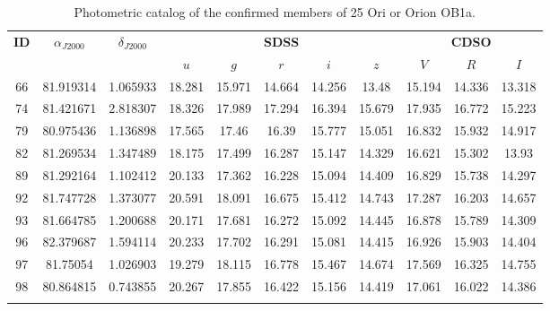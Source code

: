 \documentclass[12pt]{article}
\begin{document}
\begin{table} \scriptsize
 \caption[Photometric catalog of the confirmed members from the BOSS spectra]{Photometric catalog of the confirmed members of 25 Ori or Orion OB1a.}
 \label{tab_BOSS:photometry}
 \begin{threeparttable}
  \setlength{\tabcolsep}{12pt}
  \begin{tabular}{@{\extracolsep{2pt}}ccccccccccc@{}}
	\toprule
	{\bf ID} & {\bf $\alpha_{J2000}$} & $\delta_{J2000}$ & \multicolumn{5}{c}{{\bf SDSS}} & \multicolumn{3}{c}{{\bf CDSO}} \\
   	\cline{4-8}
   	\cline{9-11}
	& & & $u$ & $g$ & $r$ & $i$ & $z$ & $V$    & $R$    & $I$ \\
	\midrule
 	66  & 81.919314 & 1.065933 & 18.281    & 15.971    & 14.664    & 14.256    & 13.48     & 15.194 & 14.336 & 13.318 \\
  	74  & 81.421671 & 2.818307 & 18.326    & 17.989    & 17.294    & 16.394    & 15.679    & 17.935 & 16.772 & 15.223 \\
  	79  & 80.975436 & 1.136898 & 17.565    & 17.46     & 16.39     & 15.777    & 15.051    & 16.832 & 15.932 & 14.917 \\
  	82  & 81.269534 & 1.347489 & 18.175    & 17.499    & 16.287    & 15.147    & 14.329    & 16.621 & 15.302 & 13.93  \\
  	89  & 81.292164 & 1.102412 & 20.133    & 17.362    & 16.228    & 15.094    & 14.409    & 16.829 & 15.738 & 14.297 \\
  	92  & 81.747728 & 1.373077 & 20.591    & 18.091    & 16.675    & 15.412    & 14.743    & 17.287 & 16.203 & 14.657 \\
  	93  & 81.664785 & 1.200688 & 20.171    & 17.681    & 16.272    & 15.092    & 14.445    & 16.878 & 15.789 & 14.309 \\
  	96  & 82.379687 & 1.594114 & 20.233    & 17.702    & 16.291    & 15.081    & 14.415    & 16.926 & 15.903 & 14.404 \\
  	97  & 81.75054  & 1.026903 & 19.279    & 18.115    & 16.778    & 15.467    & 14.674    & 17.569 & 16.325 & 14.755 \\
  	98  & 80.864815 & 0.743855 & 20.267    & 17.855    & 16.422    & 15.156    & 14.419    & 17.061 & 16.022 & 14.386 \\
	\bottomrule
   \vspace{-1.5ex}
  \end{tabular}

\end{threeparttable}
\end{table}
\end{document}
